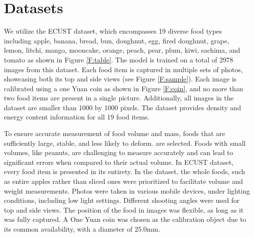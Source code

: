 \documentclass[12pt, a4paper, twoside]{article}
\begin{document}
	
	\section{Datasets}
	We utilize the ECUST dataset, which encompasses 19 diverse food types including apple, banana, bread, bun, doughnut, egg, fired doughnut, grape, lemon, litchi, mango, mooncake, orange, peach, pear, plum, kiwi, sachima, and tomato as shown in Figure \ref{F:table}. The model is trained on a total of 2978 images from this dataset. Each food item is captured in multiple sets of photos, showcasing both its top and side views (see Figure \ref{F:sample}). Each image is calibrated using a one Yuan coin as shown in Figure \ref{F:coin}, and no more than two food items are present in a single picture. Additionally, all images in the dataset are smaller than 1000 by 1000 pixels. The dataset provides density and energy content information for all 19 food items.
	\par
	To ensure accurate measurement of food volume and mass, foods that are sufficiently large, stable, and less likely to deform. are selected. Foods with small volumes, like peanuts, are challenging to measure accurately and can lead to significant errors when compared to their actual volume. In ECUST dataset, every food item is presented in its entirety. In the dataset, the whole foods, such as entire apples rather than sliced ones were prioritized to facilitate volume and weight measurements. Photos were taken in various mobile devices, under lighting conditions, including low light settings. Different shooting angles were used for top and side views. The position of the food in images was flexible, as long as it was fully captured. A One Yuan coin was chosen as the calibration object due to its common availability, with a diameter of 25.0mm.
	
\end{document}
